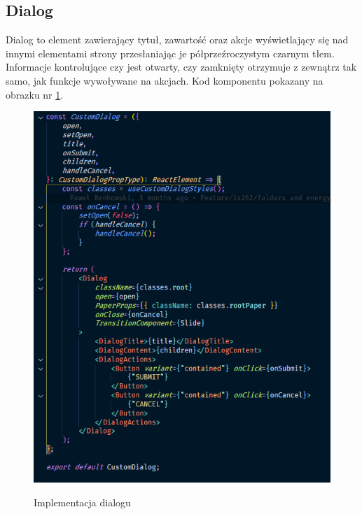 \documentclass[a4paper,11pt]{report}
\begin{document}
\subsection{Dialog}
\label{subsec:dialog}
Dialog to element zawierający tytuł, zawartość oraz akcje wyświetlający się nad innymi
 elementami strony przesłaniając je półprzeźroczystym czarnym tłem.
Informacje kontrolujące czy jest otwarty, czy zamknięty otrzymuje z zewnątrz tak samo, jak funkcje wywoływane na akcjach.
Kod komponentu pokazany na obrazku nr \ref{fig:dialog}.
\begin{figure}[H]
	\centering
	\includegraphics[scale=0.7]{implementacja/frontend/dialog}\\
	\caption{Implementacja dialogu}
	\label{fig:dialog}
\end{figure}
\end{document}
